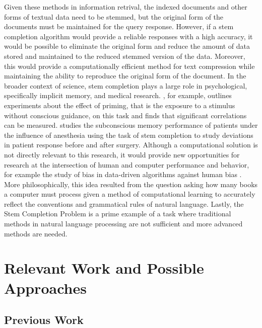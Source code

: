 \documentclass[11pt]{article}
\begin{document}
Given these methods in information retrival, the indexed documents and other forms of textual data need to be stemmed, but the original form of the documents must be maintained for the query response. However, if a stem completion algorithm would provide a reliable responses with a high accuracy, it would be possible to eliminate the original form and reduce the amount of data stored and maintained to the reduced stemmed version of the data. Moreover, this would provide a computationally efficient method for text compression while maintaining the ability to reproduce the original form of the document.
In the broader context of science, stem completion plays a large role in psychological, specifically implicit memory, and medical research. \cite{pmid26321987}, for example, outlines experiments about the effect of priming, that is the exposure to a stimulus without conscious guidance, on this task and finds that significant correlations can be measured. \cite{pmid17065885} studies the subconscious memory performance of patients under the influence of anesthesia using the task of stem completion to study deviations in patient response before and after surgery. Although a computational solution is not directly relevant to this research, it would provide new opportunities for research at the intersection of human and computer performance and behavior, for example the study of bias in data-driven algorithms against human bias \citep{TIGGEMANN200473}.
More philosophically, this idea resulted from the question asking how many books a computer must process given a method of computational learning to accurately reflect the conventions and grammatical rules of natural language. 
Lastly, the Stem Completion Problem is a prime example of a task where traditional methods in natural language processing are not sufficient and more advanced methods are needed.



\section{Relevant Work and Possible Approaches}

\subsection{Previous Work}
\end{document}
